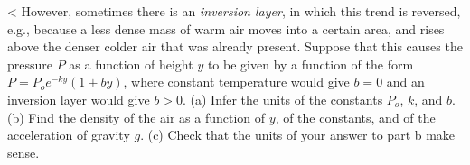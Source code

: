 <%
However, sometimes there is an \emph{inversion layer}, in which this trend is
reversed, e.g., because a less dense mass of warm air moves into a certain area,
and rises above the denser colder air that was already present. Suppose that this causes the pressure $P$ as a function
of height $y$ to be given by a function of the form $P=P_o e^{-ky}(1+by)$, where constant
temperature would give $b=0$ and an inversion layer would give $b>0$. (a)
Infer the units of  the constants $P_o$, $k$, and $b$.
(b) Find the density of the
air as a function of $y$, of the constants, and of the acceleration of gravity $g$.
(c) Check that the units of your answer to part b make sense.
